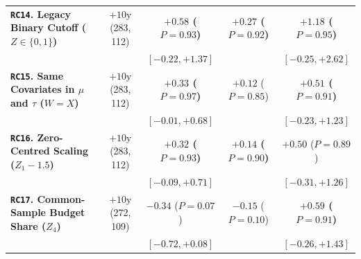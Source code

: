 \documentclass[11pt,a4paper]{article}
\newcommand{\co}{\cellcolor{colodd}}
\newcommand{\ce}{\cellcolor{coleven}}
\begin{document}
\begin{table}[htbp]
{\begin{tabular}{l|c|c|c|c}
    \hline
    \rowcolor{rowodd}
    \textbf{\texttt{RC14}. Legacy Binary Cutoff ($Z \in \{0,1\}$)} & \co $+10\text{y}$ (283, 112) & \textbf{$+0.58$ ($P=0.93$)} & \co \textbf{$+0.27$ ($P=0.92$)} & \textbf{$+1.18$ ($P=0.95$)} \\
    \rowcolor{rowodd}
                                                      & \co & {\scriptsize $[-0.22, +1.37]$} & \co {\scriptsize $[-0.10, +0.68]$} & {\scriptsize $[-0.25, +2.62]$} \\
    \hline
    \rowcolor{roweven}
    \textbf{\texttt{RC15}. Same Covariates in $\mu$ and $\tau$ ($W = X$)} & \ce $+10\text{y}$ (283, 112) & \textbf{$+0.33$ ($P=0.97$)} & \ce $+0.12$ ($P=0.85$) & \textbf{$+0.51$ ($P=0.91$)} \\
    \rowcolor{roweven}
                                                      & \ce & {\scriptsize $[-0.01, +0.68]$} & \ce {\scriptsize $[-0.09, +0.33]$} & {\scriptsize $[-0.23, +1.23]$} \\
    \hline
    \rowcolor{rowodd}
    \textbf{\texttt{RC16}. Zero-Centred Scaling ($Z_1 - 1.5$)} & \co $+10\text{y}$ (283, 112) & \textbf{$+0.32$ ($P=0.93$)} & \co \textbf{$+0.14$ ($P=0.90$)} & $+0.50$ ($P=0.89$) \\
    \rowcolor{rowodd}
                                                      & \co & {\scriptsize $[-0.09, +0.71]$} & \co {\scriptsize $[-0.06, +0.33]$} & {\scriptsize $[-0.31, +1.26]$} \\
    \hline
    \rowcolor{roweven}
    \textbf{\texttt{RC17}. Common-Sample Budget Share ($Z_4$)} & \ce $+10\text{y}$ (272, 109) & $-0.34$ ($P=0.07$) & \ce $-0.15$ ($P=0.10$) & \textbf{$+0.59$ ($P=0.91$)} \\
    \rowcolor{roweven}
                                                      & \ce & {\scriptsize $[-0.72, +0.08]$} & \ce {\scriptsize $[-0.37, +0.08]$} & {\scriptsize $[-0.26, +1.43]$} \\
    \bottomrule
  \end{tabular}%
  }
\end{table}
\end{document}
